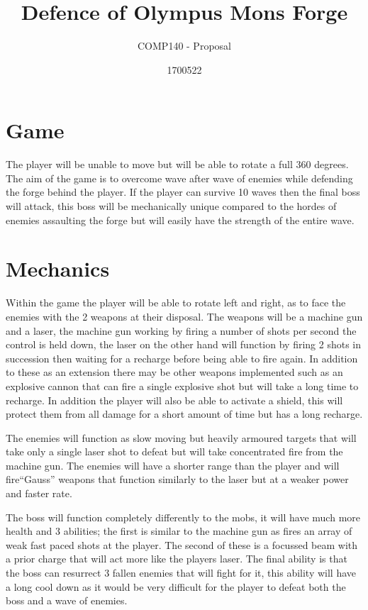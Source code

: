 \documentclass[10pt,a4paper]{scrartcl}
\title{Defence of Olympus Mons Forge}
\subtitle{COMP140 - Proposal}
\author{1700522}
\begin{document}
	\maketitle
	\section{Game}
			The player will be unable to move but will be able to rotate a full 360 degrees. The 	aim of the game is to overcome wave after wave of enemies while defending the forge behind 			the player. If the player can survive 10 waves then the final boss will attack, this boss 			will be mechanically unique compared to the hordes of enemies assaulting the forge but will 		easily have the strength of the entire wave.
	\section{Mechanics}
			Within the game the player will be able to rotate left and right, as to face the enemies with the 2 weapons at their disposal. The weapons will be a machine gun and a laser, the machine gun working by firing a number of shots per second the control is held down, the laser on the other hand will function by firing 2 shots in succession then waiting for a recharge before being able to fire again. In addition to these as an extension there may be other weapons implemented such as an explosive cannon that can fire a single explosive shot but will take a long time to recharge. In addition the player will also be able to activate a shield, this will protect them from all damage for a short amount of time but has a long recharge.
			
			The enemies will function as slow moving but heavily armoured targets that will take only a single laser shot to defeat but will take concentrated fire from the machine gun. The enemies will have a shorter range than the player and will fire``Gauss'' weapons that function similarly to the laser but at a weaker power and faster rate.
			
			The boss will function completely differently to the mobs, it will have much more health and 3 abilities; the first is similar to the machine gun as fires an array of weak fast paced shots at the player. The second of these is a focussed beam with a prior charge that will act more like the players laser. The final ability is that the boss can resurrect 3 fallen enemies that will fight for it, this ability will have a long cool down as it would be very difficult for the player to defeat both the boss and a wave of enemies.
\end{document}
